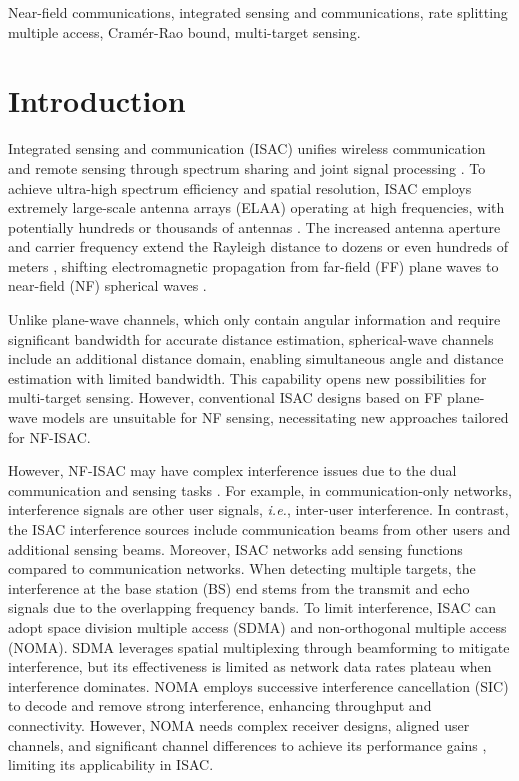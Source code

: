 \documentclass[10pt,journal,twocolumn]{IEEEtran}
\begin{document}
\begin{IEEEkeywords}
Near-field communications, integrated sensing and communications, rate splitting multiple access, Cram\'{e}r-Rao bound, multi-target sensing.
\end{IEEEkeywords}

\section{Introduction} 
Integrated sensing and communication (ISAC) unifies wireless communication and remote sensing through spectrum sharing and joint signal processing \cite{9737357}. To achieve ultra-high spectrum efficiency and spatial resolution, ISAC employs extremely large-scale antenna arrays (ELAA) operating at high frequencies, with potentially hundreds or thousands of antennas \cite{wang2024performance}. The increased antenna aperture and carrier frequency extend the Rayleigh distance to dozens or even hundreds of meters \cite{10587118}, shifting electromagnetic propagation from far-field (FF) plane waves to near-field (NF) spherical waves \cite{he2024unlocking}.

Unlike plane-wave channels, which only contain angular information and require significant bandwidth for accurate distance estimation\cite{10663521}, spherical-wave channels include an additional distance domain, enabling simultaneous angle and distance estimation with limited bandwidth\cite{10388218}. This capability opens new possibilities for multi-target sensing. However, conventional ISAC designs based on FF plane-wave models are unsuitable for NF sensing, necessitating new approaches tailored for NF-ISAC.

However, NF-ISAC may have complex interference issues due to the dual communication and sensing tasks \cite{10486996}. For example, in communication-only networks, interference signals are other user signals, \emph{i.e.}, inter-user interference. In contrast, the ISAC interference sources include communication beams from other users and additional sensing beams. Moreover, ISAC networks add sensing functions compared to communication networks.   When detecting multiple targets, the interference at the base station (BS) end stems from the transmit and echo signals due to the overlapping frequency bands. To limit interference, ISAC can adopt space division multiple access (SDMA)\cite{10050406} and non-orthogonal multiple access (NOMA)\cite{9927490,10423585}. SDMA leverages spatial multiplexing through beamforming to mitigate interference, but its effectiveness is limited as network data rates plateau when interference dominates\cite{mao2018rate}. NOMA employs successive interference cancellation (SIC) to decode and remove strong interference, enhancing throughput and connectivity. However, NOMA needs complex receiver designs, aligned user channels, and significant channel differences to achieve its performance gains \cite{mao2018rate}, limiting its applicability in ISAC.
\end{document}
